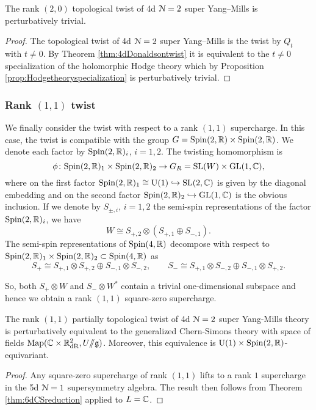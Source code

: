 \documentclass[10pt, oneside]{article}
\renewcommand{\U}{\mathrm{U}}
\newcommand{\ham}{/\!\!/}
\begin{document}
\begin{corollary}
The rank $(2,0)$ topological twist of 4d $\mathcal N=2$ super Yang--Mills is perturbatively trivial.
\label{cor:4dDonaldsontwist}
\end{corollary}
\begin{proof}
The topological twist of 4d $\mathcal N=2$ super Yang--Mills is the twist by $Q_t$ with $t\neq 0$. By Theorem \ref{thm:4dDonaldsontwist} it is equivalent to the $t\neq 0$ specialization of the holomorphic Hodge theory which by Proposition \ref{prop:Hodgetheoryspecialization} is perturbatively trivial.
\end{proof}

\subsubsection{Rank \texorpdfstring{$(1,1)$}{(1,1)} twist}
\label{sect:4d_2_11}

We finally consider the twist with respect to a rank $(1,1)$ supercharge.
In this case, the twist is compatible with the group $G = \mathrm{Spin}(2, \mathbb R) \times \mathrm{Spin}(2, \mathbb R)$. 
We denote each factor by $\mathrm{Spin}(2, \mathbb R)_i$, $i=1,2$.  
The twisting homomorphism is
\[
\phi \colon \mathrm{Spin}(2, \mathbb R)_1 \times \mathrm{Spin}(2, \mathbb R)_2 \to G_R=\mathrm{SL}(W)\times \mathrm{GL}(1, \mathbb C),
\]
where on the first factor $\Spin(2, \RR)_1 \cong \U(1)\hookrightarrow \SL(2, \CC)$ is given by the diagonal embedding and on the second factor $\mathrm{Spin}(2, \mathbb R)_2 \hookrightarrow \mathrm{GL}(1, \mathbb C)$ is the obvious inclusion. 
If we denote by $S_{\pm, i}$, $i=1,2$ the semi-spin representations of the factor $\mathrm{Spin}(2, \mathbb R)_i$, we have
\[W \cong S_{+,2}\otimes (S_{+,1}\oplus S_{-,1}).\]
The semi-spin representations of $\mathrm{Spin}(4, \mathbb R)$ decompose with respect to $\mathrm{Spin}(2, \mathbb R)_1 \times \mathrm{Spin}(2, \mathbb R)_2\subset \mathrm{Spin}(4, \mathbb R)$ as
\[S_+\cong S_{+,1} \otimes S_{+,2} \oplus S_{-,1} \otimes S_{-,2},\qquad S_-\cong S_{+,1} \otimes S_{-,2} \oplus S_{-,1} \otimes S_{+,2}.\]

So, both $S_+\otimes W$ and $S_-\otimes W^*$ contain a trivial one-dimensional subspace and hence we obtain a rank $(1, 1)$ square-zero supercharge.

\begin{theorem} \label{thm:4d_11_twist}
The rank $(1,1)$ partially topological twist of 4d $\mathcal{N}=2$ super Yang-Mills theory is perturbatively equivalent to the generalized Chern-Simons theory with space of fields $\mr{Map}(\CC \times \RR^2_{\mr{dR}}, U\ham \gg)$.  
Moreover, this equivalence is $\U(1) \times \Spin(2, \RR)$-equivariant.
\end{theorem}
\begin{proof}
Any square-zero supercharge of rank $(1, 1)$ lifts to a rank $1$ supercharge in the 5d $\mathcal N=1$ supersymmetry algebra.
The result then follows from Theorem \ref{thm:6dCSreduction} applied to $L = \mathbb C$. 
\end{proof}
\end{document}

